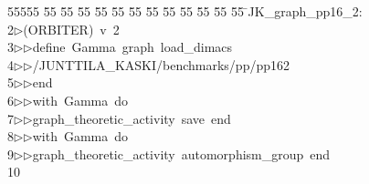%
%
\begin{tabbing}
55555 \= 55 \= 55 \= 55 \= 55 \= 55 \= 55 \= 55 \= 55 \= 55 \= 55 \= 55 \= 55 \= \>JK\_graph\_pp16\_2:\\[0pt]
2\>$\triangleright$\>(ORBITER)\ v\ 2\ \\[0pt]
3\>$\triangleright$\>$\triangleright$\>define\ Gamma\ graph\ load\_dimacs\ \\[0pt]
4\>$\triangleright$\>$\triangleright$\>/JUNTTILA\_KASKI/benchmarks/pp/pp162\ \\[0pt]
5\>$\triangleright$\>$\triangleright$\>end\ \\[0pt]
6\>$\triangleright$\>$\triangleright$\>with\ Gamma\ do\ \\[0pt]
7\>$\triangleright$\>$\triangleright$\>graph\_theoretic\_activity\ save\ end\ \\[0pt]
8\>$\triangleright$\>$\triangleright$\>with\ Gamma\ do\ \\[0pt]
9\>$\triangleright$\>$\triangleright$\>graph\_theoretic\_activity\ automorphism\_group\ end\ \\[0pt]
10\>\end{tabbing}
